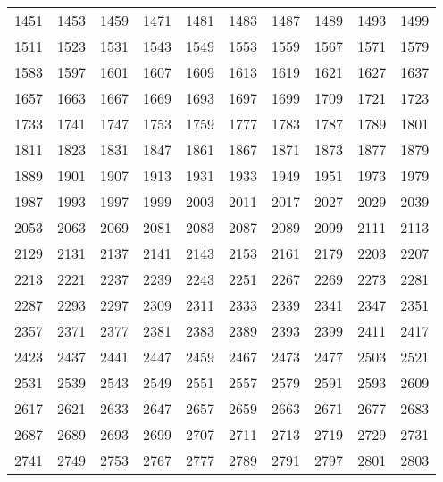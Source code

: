 {\begin{tabular}{llllllllll}
1451 &1453 &1459 &1471 &1481 &1483 &1487 &1489 &1493 &1499 \\
1511 &1523 &1531 &1543 &1549 &1553 &1559 &1567 &1571 &1579 \\
1583 &1597 &1601 &1607 &1609 &1613 &1619 &1621 &1627 &1637 \\
1657 &1663 &1667 &1669 &1693 &1697 &1699 &1709 &1721 &1723 \\
1733 &1741 &1747 &1753 &1759 &1777 &1783 &1787 &1789 &1801 \\
1811 &1823 &1831 &1847 &1861 &1867 &1871 &1873 &1877 &1879 \\
1889 &1901 &1907 &1913 &1931 &1933 &1949 &1951 &1973 &1979 \\
1987 &1993 &1997 &1999 &2003 &2011 &2017 &2027 &2029 &2039 \\
2053 &2063 &2069 &2081 &2083 &2087 &2089 &2099 &2111 &2113 \\
2129 &2131 &2137 &2141 &2143 &2153 &2161 &2179 &2203 &2207 \\
2213 &2221 &2237 &2239 &2243 &2251 &2267 &2269 &2273 &2281 \\
2287 &2293 &2297 &2309 &2311 &2333 &2339 &2341 &2347 &2351 \\
2357 &2371 &2377 &2381 &2383 &2389 &2393 &2399 &2411 &2417 \\
2423 &2437 &2441 &2447 &2459 &2467 &2473 &2477 &2503 &2521 \\
2531 &2539 &2543 &2549 &2551 &2557 &2579 &2591 &2593 &2609 \\
2617 &2621 &2633 &2647 &2657 &2659 &2663 &2671 &2677 &2683 \\
2687 &2689 &2693 &2699 &2707 &2711 &2713 &2719 &2729 &2731 \\
2741 &2749 &2753 &2767 &2777 &2789 &2791 &2797 &2801 &2803 \\
\bottomrule
\end{tabular}
\par}

